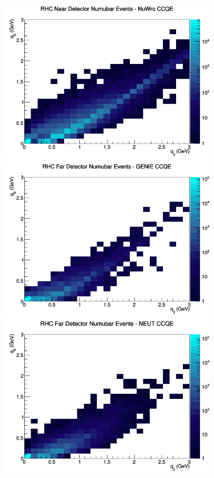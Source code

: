 \begin{figure}[h]
\includegraphics[width=\linewidth]{eff_q0_q3/FGT/CCQE_RHC_ND_numubar_q3_q0_NuWro.png}
\endminipage
\newline
{}
\includegraphics[width=\linewidth]{eff_q0_q3/FGT/CCQE_RHC_FD_numubar_q3_q0_GENIE.png}
\endminipage
{}
\includegraphics[width=\linewidth]{eff_q0_q3/FGT/CCQE_RHC_FD_numubar_q3_q0_NEUT.png}

\end{figure}
